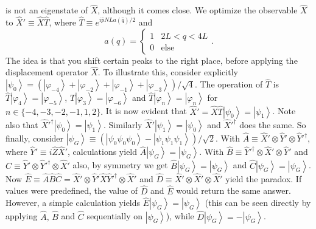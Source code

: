is not an eigenstate of $\hat{X}$, although it comes close. We optimize
the observable $\hat{X}$ to $\hat{X}'\equiv\hat{X}\hat{T}$, where
$\hat{T}\equiv e^{i\hat{p}NLa(\hat{q})/2}$ and 
\[
a(q)=\begin{cases}
1 & 2L<q<4L\\
0 & \text{else}
\end{cases}.
\]
The idea is that you shift certain peaks to the right place, before
applying the displacement operator $\hat{X}$. To illustrate this,
consider explicitly $\left|\psi_{0}\right\rangle =\left(\left|\varphi_{-4}\right\rangle +\left|\varphi_{-2}\right\rangle +\left|\varphi_{-1}\right\rangle +\left|\varphi_{-3}\right\rangle \right)/\sqrt{4}$.
The operation of $\hat{T}$ is $\hat{T}\left|\varphi_{4}\right\rangle =\left|\varphi_{-5}\right\rangle $,
$\hat{T}\left|\varphi_{3}\right\rangle =\left|\varphi_{-6}\right\rangle $
and $\hat{T}\left|\varphi_{n}\right\rangle =\left|\varphi_{n}\right\rangle $
for $n\in\{-4,-3,-2,-1,1,2\}.$ It is now evident that $\hat{X}'=\hat{X}\hat{T}\left|\psi_{0}\right\rangle =\left|\psi_{1}\right\rangle $.
Note also that $\hat{X}'^{\dagger}\left|\psi_{0}\right\rangle =\left|\psi_{1}\right\rangle $.
Similarly $\hat{X}'\left|\psi_{1}\right\rangle =\left|\psi_{0}\right\rangle $
and $\hat{X}'^{\dagger}$ does the same. So finally, consider $\left|\psi_{G}\right\rangle \equiv\left(\left|\psi_{0}\psi_{0}\psi_{0}\right\rangle -\left|\psi_{1}\psi_{1}\psi_{1}\right\rangle \right)/\sqrt{2}$.
With $\hat{A}\equiv\hat{X}'\otimes\hat{Y}'\otimes\hat{Y}'^{\dagger}$,
where $\hat{Y}'\equiv i\hat{Z}\hat{X}'$, calculations yield $\hat{A}\left|\psi_{G}\right\rangle =\left|\psi_{G}\right\rangle $.
With $\hat{B}\equiv\hat{Y}'^{\dagger}\otimes\hat{X}'\otimes\hat{Y}'$
and $\hat{C}\equiv\hat{Y}'\otimes\hat{Y}'^{\dagger}\otimes\hat{X}'$
also, by symmetry we get $\hat{B}\left|\psi_{G}\right\rangle =\left|\psi_{G}\right\rangle $
and $\hat{C}\left|\psi_{G}\right\rangle =\left|\psi_{G}\right\rangle $.
Now $\hat{E}\equiv\hat{A}\hat{B}\hat{C}=\hat{X}'\otimes\hat{Y}'\hat{X}\hat{Y}'^{\dagger}\otimes\hat{X}'$
and $\hat{D}\equiv\hat{X}'\otimes\hat{X}'\otimes\hat{X}'$ yield the
paradox. If values were predefined, the value of $\hat{D}$ and $\hat{E}$
would return the same answer. However, a simple calculation yields
$\hat{E}\left|\psi_{G}\right\rangle =\left|\psi_{G}\right\rangle $
(this can be seen directly by applying $\hat{A},\,\hat{B}$ and $\hat{C}$
sequentially on $\left|\psi_{G}\right\rangle $), while $\hat{D}\left|\psi_{G}\right\rangle =-\left|\psi_{G}\right\rangle $.

